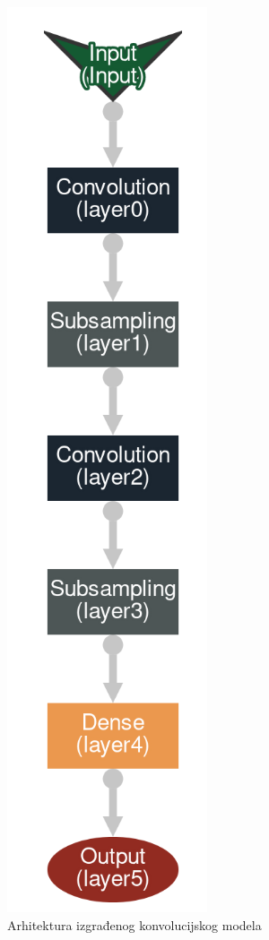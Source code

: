 \documentclass[times, utf8, diplomski]{fer}
\theoremstyle{definition}
\begin{document}
\begin{figure}[h]
\centering
\includegraphics[scale=0.4]{arhitektura_neuronske_mreze.png}
\caption{Arhitektura izgrađenog konvolucijskog modela}
\end{figure}
\end{document}
